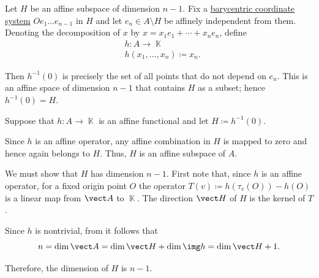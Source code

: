 \begin{defproof}
   Let \( H \) be an affine subspace of dimension \( n - 1 \). Fix a \hyperref[def:barycentric_coordinate_system]{barycentric coordinate system} \( O e_1 \ldots e_{n-1} \) in \( H \) and let \( e_n \in A \setminus H \) be affinely independent from them. Denoting the decomposition of \( x \) by \( x = x_1 e_1 + \cdots + x_n e_n \), define
  \begin{equation*}
    \begin{aligned}
      &h: A \to \BbbK \\
      &h(x_1, \ldots, x_n) \coloneqq x_n.
    \end{aligned}
  \end{equation*}

  Then \( h^{-1}(0) \) is precisely the set of all points that do not depend on \( e_n \). This is an affine space of dimension \( n - 1 \) that contains \( H \) as a subset; hence \( h^{-1}(0) = H \).

   Suppose that \( h: A \to \BbbK \) is an affine functional and let \( H \coloneqq h^{-1}(0) \).

  Since \( h \) is an affine operator, any affine combination in \( H \) is mapped to zero and hence again belongs to \( H \). Thus, \( H \) is an affine subspace of \( A \).

  We must show that \( H \) has dimension \( n - 1 \). First note that, since \( h \) is an affine operator, for a fixed origin point \( O \) the operator \( T(v) \coloneqq h(\tau_v(O)) - h(O) \) is a linear map from \( \vect A \) to \( \BbbK \). The direction \( \vect H \) of \( H \) is the kernel of \( T \).

  Since \( h \) is nontrivial, from  it follows that
  \begin{equation*}
    n = \dim \vect A = \dim \vect H + \dim \img h = \dim \vect H + 1.
  \end{equation*}

  Therefore, the dimension of \( H \) is \( n - 1 \).
\end{defproof}
